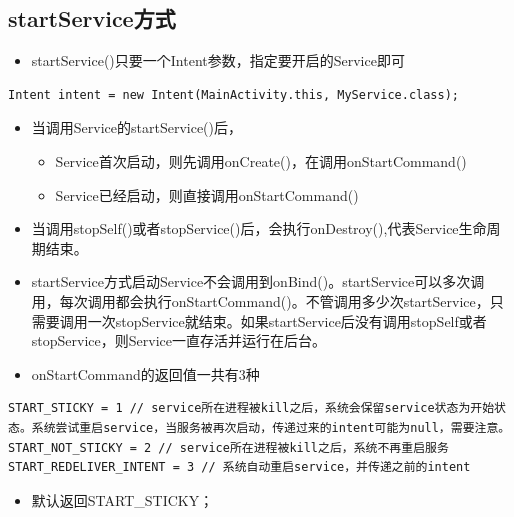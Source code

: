 \documentclass[9pt, b5paper]{article}
\begin{document}
\subsection{startService方式}
\label{sec-1-2}
\begin{itemize}
\item startService()只要一个Intent参数，指定要开启的Service即可
\end{itemize}
\begin{verbatim}
Intent intent = new Intent(MainActivity.this, MyService.class);
\end{verbatim}
\begin{itemize}
\item 当调用Service的startService()后，
\begin{itemize}
\item Service首次启动，则先调用onCreate()，在调用onStartCommand()
\item Service已经启动，则直接调用onStartCommand()
\end{itemize}
\item 当调用stopSelf()或者stopService()后，会执行onDestroy(),代表Service生命周期结束。
\item startService方式启动Service不会调用到onBind()。startService可以多次调用，每次调用都会执行onStartCommand()。不管调用多少次startService，只需要调用一次stopService就结束。如果startService后没有调用stopSelf或者stopService，则Service一直存活并运行在后台。
\item onStartCommand的返回值一共有3种
\end{itemize}
\begin{verbatim}
START_STICKY = 1 // service所在进程被kill之后，系统会保留service状态为开始状态。系统尝试重启service，当服务被再次启动，传递过来的intent可能为null，需要注意。
START_NOT_STICKY = 2 // service所在进程被kill之后，系统不再重启服务
START_REDELIVER_INTENT = 3 // 系统自动重启service，并传递之前的intent
\end{verbatim}
\begin{itemize}
\item 默认返回START\_STICKY；
\end{itemize}
\end{document}
